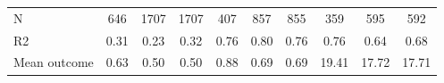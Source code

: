 \begin{tabular}{lccc|ccc|ccc}
N           &         646         &        1707         &        1707         &         407         &         857         &         855         &         359         &         595         &         592         \\
R2          &        0.31         &        0.23         &        0.32         &        0.76         &        0.80         &        0.76         &        0.76         &        0.64         &        0.68         \\
Mean outcome&        0.63         &        0.50         &        0.50         &        0.88         &        0.69         &        0.69         &       19.41         &       17.72         &       17.71         \\
\bottomrule \end{tabular}
